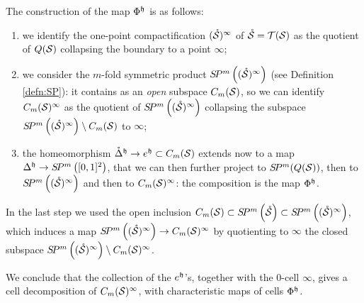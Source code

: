 The construction of the map $\Phi^{\tup}$ is as follows:
\begin{enumerate}
\item we identify the one-point compactification
$(\mrS)^{\infty}$ of $\mrS=\T(\S)$ as the quotient of $Q(\S)$ collapsing the boundary to a point $\infty$;
\item we consider the $m$-fold symmetric product $\SP^m\pa{(\mrS)^{\infty}}$ (see Definition \ref{defn:SP}): it contains 
as an \emph{open} subspace $\cms$, so we can identify $\cms^{\infty}$ as the quotient of $\SP^m\pa{(\mrS)^{\infty}}$ collapsing
the subspace $\SP^m\pa{(\mrS)^{\infty}}\setminus\cms$ to $\infty$;
\item the homeomorphism $\mathring{\Delta}^{\tup}\to e^{\tup}\subset\cms$ extends
now to a map $\Delta^{\tup}\to\SP^m\pa{[0,1]^2}$, that we can then further project to $\SP^m(Q(\S))$, then to
$ \SP^m\pa{(\mrS)^{\infty}}$ and then to $\cms^{\infty}$: the composition
is the map $\Phi^{\tup}$.
\end{enumerate}
In the last step we used the open inclusion $\cms\subset\SP^m\pa{\mrS}\subset\SP^m\pa{(\mrS)^{\infty}}$, which
induces a map $ \SP^m\pa{(\mrS)^{\infty}}\to\cms^{\infty}$ by quotienting to $\infty$ the closed subspace
$ \SP^m\pa{(\mrS)^{\infty}}\setminus \cms^{\infty}$.

We conclude that the collection of the $e^{\tup}$'s, together with the $0$-cell $\infty$,
gives a cell decomposition of $\cms^{\infty}$, with characteristic maps of cells $\Phi^{\tup}$.

